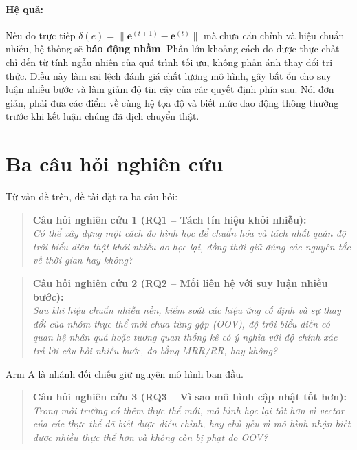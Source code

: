 \paragraph{Hệ quả:}
Nếu đo trực tiếp $\delta(e) = \|\mathbf{e}^{(t+1)} - \mathbf{e}^{(t)}\|$ mà chưa căn chỉnh và hiệu chuẩn nhiễu, hệ thống sẽ \textbf{báo động nhầm}. Phần lớn khoảng cách đo được thực chất chỉ đến từ tính ngẫu nhiên của quá trình tối ưu, không phản ánh thay đổi tri thức. Điều này làm sai lệch đánh giá chất lượng mô hình, gây bất ổn cho suy luận nhiều bước và làm giảm độ tin cậy của các quyết định phía sau. Nói đơn giản, phải đưa các điểm về cùng hệ tọa độ và biết mức dao động thông thường trước khi kết luận chúng đã dịch chuyển thật.

\section{Ba câu hỏi nghiên cứu}
\label{sec:research_questions}

Từ vấn đề trên, đề tài đặt ra ba câu hỏi:

\begin{quote}
    \textbf{Câu hỏi nghiên cứu 1 (RQ1 -- Tách tín hiệu khỏi nhiễu):} \\
    \textit{Có thể xây dựng một cách đo hình học để chuẩn hóa và tách nhất quán độ trôi biểu diễn thật khỏi nhiễu do học lại, đồng thời giữ đúng các nguyên tắc về thời gian hay không?}
\end{quote}

\begin{quote}
    \textbf{Câu hỏi nghiên cứu 2 (RQ2 -- Mối liên hệ với suy luận nhiều bước):} \\
    \textit{Sau khi hiệu chuẩn nhiễu nền, kiểm soát các hiệu ứng cố định và sự thay đổi của nhóm thực thể mới chưa từng gặp (OOV), độ trôi biểu diễn có quan hệ nhân quả hoặc tương quan thống kê có ý nghĩa với độ chính xác trả lời câu hỏi nhiều bước, đo bằng MRR/RR, hay không?}
\end{quote}
Arm A là nhánh đối chiếu giữ nguyên mô hình ban đầu.

\begin{quote}
    \textbf{Câu hỏi nghiên cứu 3 (RQ3 -- Vì sao mô hình cập nhật tốt hơn):} \\
    \textit{Trong môi trường có thêm thực thể mới, mô hình học lại tốt hơn vì vector của các thực thể đã biết được điều chỉnh, hay chủ yếu vì mô hình nhận biết được nhiều thực thể hơn và không còn bị phạt do OOV?}
\end{quote}

